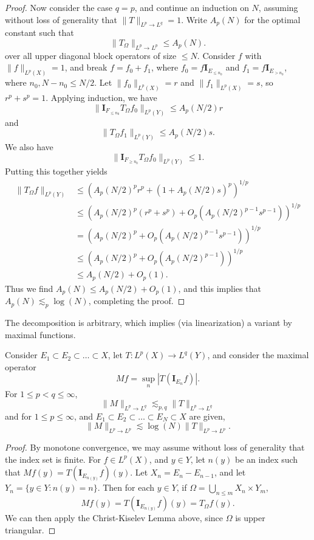 \begin{proof}
    Now consider the case $q = p$, and continue an induction on $N$, assuming without loss of generality that $\| T \|_{L^p \to L^q} = 1$. Write $A_p(N)$ for the optimal constant such that
    \[ \| T_\Omega \|_{L^p \to L^p} \leq A_p(N). \]
    over all upper diagonal block operators of size $\leq N$. Consider $f$ with $\| f \|_{L^p(X)} = 1$, and break $f = f_0 + f_1$, where $f_0 = f \mathbf{I}_{E_{\leq n_0}}$ and $f_1 = f \mathbf{I}_{E_{> n_0}}$, where $n_0, N - n_0 \leq N/2$. Let $\| f_0 \|_{L^p(X)} = r$ and $\| f_1 \|_{L^p(X)} = s$, so $r^p + s^p = 1$. Applying induction, we have
    \[ \| \mathbf{I}_{F_{\leq n_0}} T_\Omega f_0 \|_{L^p(Y)} \leq A_p(N/2) r \]
    and
    \[ \| T_\Omega f_1 \|_{L^p(Y)} \leq A_p(N/2) s. \]
    We also have
    \[ \| \mathbf{I}_{F_{\geq n_0}} T_\Omega f_0 \|_{L^p(Y)} \leq 1. \]
    Putting this together yields
    \begin{align*}
        \| T_\Omega f \|_{L^p(Y)} &\leq ( A_p(N/2)^p r^p + (1 + A_p(N/2) s)^p  )^{1/p}\\
        &\leq ( A_p(N/2)^p (r^p + s^p) + O_p(A_p(N/2)^{p-1} s^{p-1}) )^{1/p}\\
        &= ( A_p(N/2)^p + O_p(A_p(N/2)^{p-1} s^{p-1}) )^{1/p}\\
        &\leq ( A_p(N/2)^p + O_p(A_p(N/2)^{p-1}) )^{1/p}\\
        &\leq A_p(N/2) + O_p(1).
    \end{align*}
    Thus we find $A_p(N) \leq A_p(N/2) + O_p(1)$, and this implies that $A_p(N) \lesssim_p \log(N)$, completing the proof.
\end{proof}

The decomposition is arbitrary, which implies (via linearization) a variant by maximal functions.

\begin{theorem}
    Consider $E_1 \subset E_2 \subset \dots \subset X$, let $T: L^p(X) \to L^q(Y)$, and consider the maximal operator
    \[ Mf = \sup_n | T(\mathbf{I}_{E_n} f) |. \]
    For $1 \leq p < q \leq \infty$,
    \[ \| M \|_{L^p \to L^q} \lesssim_{p,q} \| T \|_{L^p \to L^q} \]
    and for $1 \leq p \leq \infty$, and $E_1 \subset E_2 \subset \dots \subset E_N \subset X$ are given,
    \[ \| M \|_{L^p \to L^p} \lesssim \log(N) \| T \|_{L^p \to L^p}. \]
\end{theorem}
\begin{proof}
    By monotone convergence, we may assume without loss of generality that the index set is finite. For $f \in L^p(X)$, and $y \in Y$, let $n(y)$ be an index such that $Mf(y) = T(\mathbf{I}_{E_{n(y)}} f)(y)$. Let $X_n = E_n - E_{n-1}$, and let $Y_n = \{ y \in Y: n(y) = n \}$. Then for each $y \in Y$, if $\Omega = \bigcup_{n \leq m} X_n \times Y_m$,
    \[ Mf(y) = T(\mathbf{I}_{E_{n(y)}} f)(y) = T_\Omega f(y). \]
    We can then apply the Christ-Kiselev Lemma above, since $\Omega$ is upper triangular.
\end{proof}

